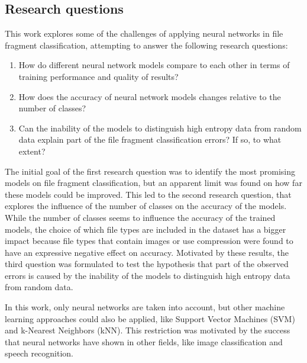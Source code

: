 \subsection{Research questions}
This work explores some of the challenges of applying neural networks in file fragment classification, attempting to answer the following research questions:

\begin{enumerate}[itemindent=\parindent,label=\textbf{Q\arabic*.}]

    \item How do different neural network models compare to each other in terms of training performance and quality of results?
    
    \item How does the accuracy of neural network models changes relative to the number of classes?

    \item Can the inability of the models to distinguish high entropy data from random data explain part of the file fragment classification errors? If so, to what extent?
\end{enumerate}

The initial goal of the first research question was to identify the most promising models on file fragment classification, but an apparent limit was found on how far these models could be improved.
This led to the second research question, that explores the influence of the number of classes on the accuracy of the models. While the number of classes seems to influence the accuracy of the trained models, the choice of which file types are included in the dataset has a bigger impact because file types that contain images or use compression were found to have an expressive negative effect on accuracy.
Motivated by these results, the third question was formulated to test the hypothesis that part of the observed errors is caused by the inability of the models to distinguish high entropy data from random data.

In this work, only neural networks are taken into account, but other machine learning approaches could also be applied, like Support Vector Machines (SVM) and k-Nearest Neighbors (kNN). This restriction was motivated by the success that neural networks have shown in other fields, like image classification and speech recognition.
